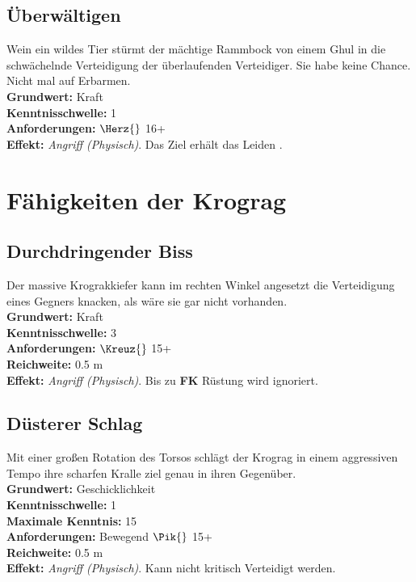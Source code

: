 \subsection*{Überwältigen} \label{sk:ueberwaeltigen}
Wein ein wildes Tier stürmt der mächtige Rammbock von einem Ghul in die schwächelnde Verteidigung der überlaufenden Verteidiger. Sie habe keine Chance. Nicht mal auf Erbarmen. \\
\textbf{Grundwert:} Kraft \\
\textbf{Kenntnisschwelle:} 1 \\
\textbf{Anforderungen:} $\Herz{}$ 16+ \\
\textbf{Effekt:} \textit{Angriff (Physisch)}. Das Ziel erhält das Leiden .


\section{Fähigkeiten der Krograg} \label{krogragskills}

\subsection*{Durchdringender Biss} \label{sk:durchdringender_biss}
Der massive Krograkkiefer kann im rechten Winkel angesetzt die Verteidigung eines Gegners knacken, als wäre sie gar nicht vorhanden.\\
\textbf{Grundwert:} Kraft \\
\textbf{Kenntnisschwelle:} 3 \\
\textbf{Anforderungen:} $\Kreuz{}$ 15+ \\
\textbf{Reichweite:} 0.5 m \\
\textbf{Effekt:} \textit{Angriff (Physisch)}. Bis zu \textbf{FK} Rüstung wird ignoriert.

\subsection*{Düsterer Schlag} \label{sk:duesterer_schlag}
Mit einer großen Rotation des Torsos schlägt der Krograg in einem aggressiven Tempo ihre scharfen Kralle ziel genau in ihren Gegenüber.\\
\textbf{Grundwert:} Geschicklichkeit \\
\textbf{Kenntnisschwelle:} 1 \\
\textbf{Maximale Kenntnis:} 15 \\
\textbf{Anforderungen:} Bewegend $\Pik{}$ 15+ \\
\textbf{Reichweite:} 0.5 m \\
\textbf{Effekt:} \textit{Angriff (Physisch)}. Kann nicht kritisch Verteidigt werden.

